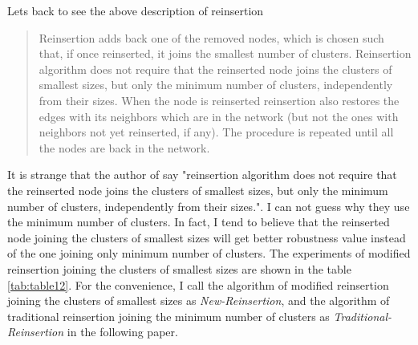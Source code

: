 \documentclass{article}
\newenvironment{itquote}
{\begin{quote}\itshape}
	{\end{quote}\ignorespacesafterend}
\begin{document}
	Let\textquotesingle s back to see the above description of reinsertion
	
	\begin{itquote}
	
	Reinsertion adds back one of the removed nodes, which is chosen such that, if once reinserted, it joins the smallest number of clusters. Reinsertion algorithm does not require that the reinserted node joins the clusters of smallest sizes, but only the minimum number of clusters, independently from their sizes. When the node is reinserted reinsertion also restores the edges with its neighbors which are in the network (but not the ones with neighbors not yet reinserted, if any). The procedure is repeated until all the nodes are back in the network. 
	
	\end{itquote}	
	
	 It is strange that the author of \cite{morone2015influence} \cite{morone2016collective} say "reinsertion algorithm does not require that the reinserted node joins the clusters of smallest sizes, but only the minimum number of clusters, independently from their sizes.". I can not guess why they use the minimum number of clusters. In fact, I tend to believe that the reinserted node joining the clusters of smallest sizes will get better robustness value instead of the one joining only minimum number of clusters. The experiments of modified reinsertion joining the clusters of smallest sizes are shown in the table \ref{tab:table12}. For the convenience, I call the algorithm of modified reinsertion joining the clusters of smallest sizes as \textit{New-Reinsertion}, and the algorithm of traditional reinsertion joining the minimum number of clusters as \textit{Traditional-Reinsertion} in the following paper.
	 
\end{document}
